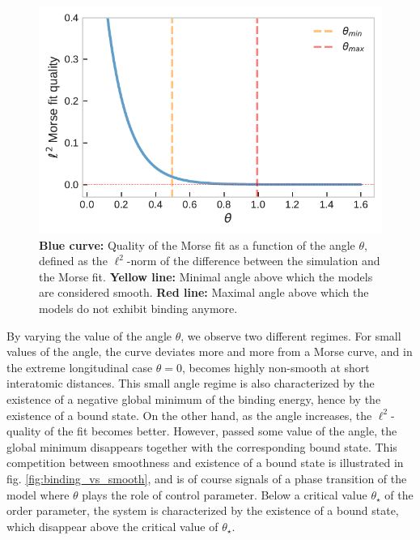 \documentclass[reprint, amsmath, amssymb, floatfix, aps, pra]{revtex4-2}
\begin{document}
    \begin{figure}
        \includegraphics[scale=0.75]{figures/morse_quality.pdf}
        \caption{\label{fig:morse_quality}\textbf{Blue curve:} Quality of the Morse fit as a function of the angle $\theta$, defined as the $\ell^2$-norm of the difference between the simulation and the Morse fit. \textbf{Yellow line:} Minimal angle above which the models are considered smooth. \textbf{Red line:} Maximal angle above which the models do not exhibit binding anymore.}
    \end{figure}

    By varying the value of the angle $\theta$, we observe two different regimes. For small values of the angle, the curve deviates more and more from a Morse curve, and in the extreme longitudinal case $\theta=0$, becomes highly non-smooth at short interatomic distances. This small angle regime is also characterized by the existence of a negative global minimum of the binding energy, hence by the existence of a bound state. On the other hand, as the angle increases, the $\ell^2$-quality of the fit becomes better. However, passed some value of the angle, the global minimum disappears together with the corresponding bound state. This competition between smoothness and existence of a bound state is illustrated in fig. \ref{fig:binding_vs_smooth}, and is of course signals of a phase transition of the model where $\theta$ plays the role of control parameter. Below a critical value $\theta_\star$ of the order parameter, the system is characterized by the existence of a bound state, which disappear above the critical value of $\theta_\star$.
\end{document}

